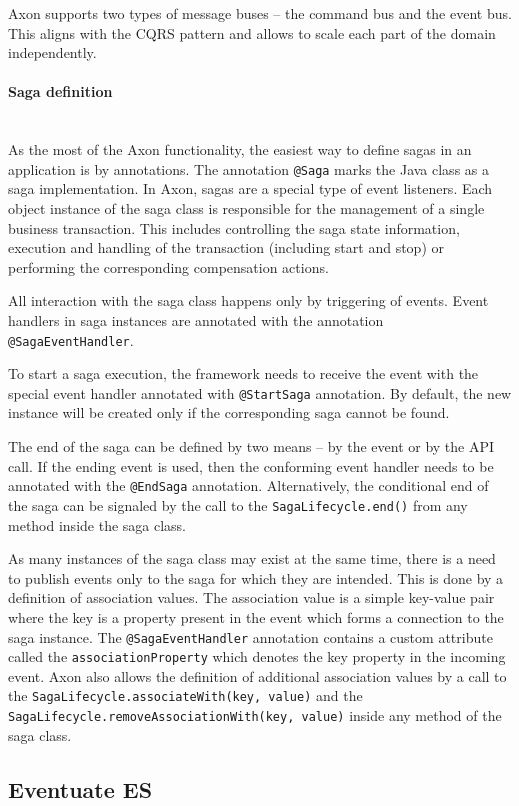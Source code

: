 \documentclass[oneside,
  digital, %
  table,   %
  lof,     %
  lot,     %
]{fithesis3}
\newcommand{\newlinepar}[1]{\paragraph{#1}\needspace{3\baselineskip}\mbox{}\\}
\begin{document}
Axon supports two types of message buses -- the command bus and the event bus. This aligns with the CQRS pattern and allows to scale each part of the domain independently.

\newlinepar{Saga definition}

As the most of the Axon functionality, the easiest way to define sagas in an application is by annotations. The annotation \texttt{@Saga} marks the Java class as a saga implementation. In Axon, sagas are a special type of event listeners. Each object instance of the saga class is responsible for the management of a single business transaction. This includes controlling the saga state information, execution and handling of the transaction (including start and stop) or performing the corresponding compensation actions.

All interaction with the saga class happens only by triggering of events. Event handlers in saga instances are annotated with the annotation \texttt{@SagaEventHandler}. 

To start a saga execution, the framework needs to receive the event with the special event handler annotated with \texttt{@StartSaga} annotation. By default, the new instance will be created only if the corresponding saga cannot be found.

The end of the saga can be defined by two means -- by the event or by the API call. If the ending event is used, then the conforming event handler needs to be annotated with the \texttt{@EndSaga} annotation. Alternatively, the conditional end of the saga can be signaled by the call to the \texttt{SagaLifecycle.end()} from any method inside the saga class.

As many instances of the saga class may exist at the same time, there is a need to publish events only to the saga for which they are intended. This is done by a definition of association values. The association value is a simple key-value pair where the key is a property present in the event which forms a connection to the saga instance. The \texttt{@SagaEventHandler} annotation contains a custom attribute called the \texttt{associationProperty} which denotes the key property in the incoming event. Axon also allows the definition of additional association values by a call to the \texttt{SagaLifecycle.associateWith(key, value)} and the \texttt{SagaLifecycle.removeAssociationWith(key, value)} inside any method of the saga class.

\subsection{Eventuate ES}
\end{document}
